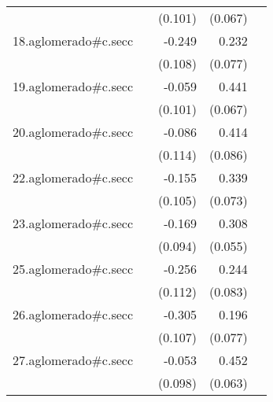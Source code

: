 {\begin{longtable}{l*{4}{D{.}{.}{-1}}}
            &                     &     (0.101)         &     (0.067)         &                     \\
\addlinespace
18.aglomerado#c.secc&                     &      -0.249\sym{*}  &       0.232\sym{**} &                     \\
            &                     &     (0.108)         &     (0.077)         &                     \\
\addlinespace
19.aglomerado#c.secc&                     &      -0.059         &       0.441\sym{***}&                     \\
            &                     &     (0.101)         &     (0.067)         &                     \\
\addlinespace
20.aglomerado#c.secc&                     &      -0.086         &       0.414\sym{***}&                     \\
            &                     &     (0.114)         &     (0.086)         &                     \\
\addlinespace
22.aglomerado#c.secc&                     &      -0.155         &       0.339\sym{***}&                     \\
            &                     &     (0.105)         &     (0.073)         &                     \\
\addlinespace
23.aglomerado#c.secc&                     &      -0.169         &       0.308\sym{***}&                     \\
            &                     &     (0.094)         &     (0.055)         &                     \\
\addlinespace
25.aglomerado#c.secc&                     &      -0.256\sym{*}  &       0.244\sym{**} &                     \\
            &                     &     (0.112)         &     (0.083)         &                     \\
\addlinespace
26.aglomerado#c.secc&                     &      -0.305\sym{**} &       0.196\sym{*}  &                     \\
            &                     &     (0.107)         &     (0.077)         &                     \\
\addlinespace
27.aglomerado#c.secc&                     &      -0.053         &       0.452\sym{***}&                     \\
            &                     &     (0.098)         &     (0.063)         &                     \\

\end{longtable}}
